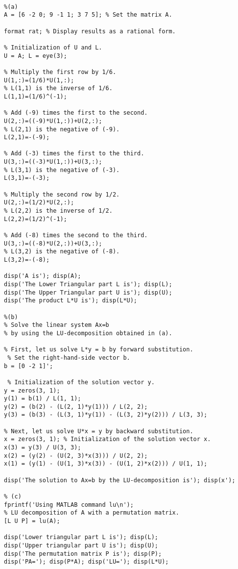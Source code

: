 \begin{sol}

\begin{verbatim}

%(a)
A = [6 -2 0; 9 -1 1; 3 7 5]; % Set the matrix A.

format rat; % Display results as a rational form.

% Initialization of U and L.
U = A; L = eye(3); 

% Multiply the first row by 1/6.
U(1,:)=(1/6)*U(1,:); 
% L(1,1) is the inverse of 1/6.
L(1,1)=(1/6)^(-1); 

% Add (-9) times the first to the second.
U(2,:)=((-9)*U(1,:))+U(2,:);
% L(2,1) is the negative of (-9).
L(2,1)=-(-9); 

% Add (-3) times the first to the third.
U(3,:)=((-3)*U(1,:))+U(3,:); 
% L(3,1) is the negative of (-3).
L(3,1)=-(-3); 

% Multiply the second row by 1/2.
U(2,:)=(1/2)*U(2,:);
% L(2,2) is the inverse of 1/2.
L(2,2)=(1/2)^(-1); 

% Add (-8) times the second to the third.
U(3,:)=((-8)*U(2,:))+U(3,:); 
% L(3,2) is the negative of (-8).
L(3,2)=-(-8); 

disp('A is'); disp(A);
disp('The Lower Triangular part L is'); disp(L);
disp('The Upper Triangular part U is'); disp(U);
disp('The product L*U is'); disp(L*U);

%(b)
% Solve the linear system Ax=b 
% by using the LU-decomposition obtained in (a).

% First, let us solve L*y = b by forward substitution.
 % Set the right-hand-side vector b.
b = [0 -2 1]';

 % Initialization of the solution vector y.
y = zeros(3, 1);
y(1) = b(1) / L(1, 1);
y(2) = (b(2) - (L(2, 1)*y(1))) / L(2, 2);
y(3) = (b(3) - (L(3, 1)*y(1)) - (L(3, 2)*y(2))) / L(3, 3);

% Next, let us solve U*x = y by backward substitution.
x = zeros(3, 1); % Initialization of the solution vector x.
x(3) = y(3) / U(3, 3);
x(2) = (y(2) - (U(2, 3)*x(3))) / U(2, 2);
x(1) = (y(1) - (U(1, 3)*x(3)) - (U(1, 2)*x(2))) / U(1, 1);

disp('The solution to Ax=b by the LU-decomposition is'); disp(x');

% (c)
fprintf('Using MATLAB command lu\n');
% LU decomposition of A with a permutation matrix.
[L U P] = lu(A);

disp('Lower triangular part L is'); disp(L);
disp('Upper triangular part U is'); disp(U);
disp('The permutation matrix P is'); disp(P);
disp('PA='); disp(P*A); disp('LU='); disp(L*U);


\end{verbatim}
\end{sol}
